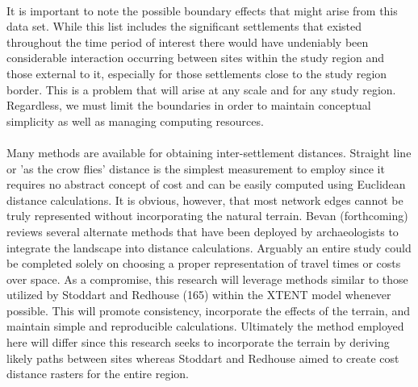 \documentclass[12pt,a4paper]{thesis}
\begin{document}
 
\paragraph{}
It is important to note the possible boundary effects that might arise from this data set. While this list includes the significant settlements that existed throughout the time period of interest there would have undeniably been considerable interaction occurring between sites within the study region and those external to it, especially for those settlements close to the study region border. This is a problem that will arise at any scale and for any study region. Regardless, we must limit the boundaries in order to maintain conceptual simplicity as well as managing computing resources.  
	
\paragraph{}
Many  methods are available for obtaining inter-settlement distances. Straight line or 'as the crow flies' distance is the simplest measurement to employ since it requires no abstract concept of cost and can be easily computed using Euclidean distance calculations. It is obvious, however, that most network edges cannot be truly represented without incorporating the natural terrain. Bevan (forthcoming) reviews several alternate methods that have been deployed by archaeologists to integrate the landscape into distance calculations. Arguably an entire study could be completed solely on choosing a proper representation of travel times or costs over space. As a compromise, this research will leverage methods similar to those utilized by Stoddart and Redhouse (165) within the XTENT model whenever possible. This will promote consistency, incorporate the effects of the terrain, and  maintain simple and reproducible calculations. Ultimately the method employed here will differ since this research seeks to  incorporate the terrain by deriving likely paths between sites whereas Stoddart and Redhouse aimed to create cost distance rasters for the entire region.  
\end{document}
